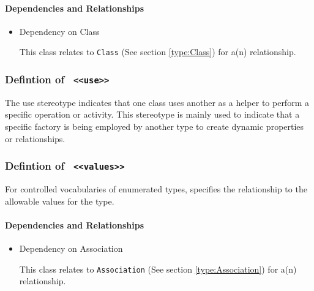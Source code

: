 \paragraph{Dependencies and Relationships}

\begin{itemize}
\item Dependency on Class

This class relates to \texttt{Class} (See section \ref{type:Class}) for a(n) \texttt{} relationship.

\end{itemize}
\FloatBarrier
\subsubsection{Defintion of \texttt{ <<use>>}}
  \label{type:use}

\FloatBarrier

The use stereotype indicates that one class uses another as a helper to perform 
a specific operation or activity. This stereotype is mainly used to indicate
that a specific factory is being employed by another type to create dynamic
properties or relationships.

\FloatBarrier
\subsubsection{Defintion of \texttt{ <<values>>}}
  \label{type:values}

\FloatBarrier

For controlled vocabularies of enumerated types, specifies the relationship to the allowable 
values for the type.

\paragraph{Dependencies and Relationships}

\begin{itemize}
\item Dependency on Association

This class relates to \texttt{Association} (See section \ref{type:Association}) for a(n) \texttt{} relationship.

\end{itemize}
\FloatBarrier
